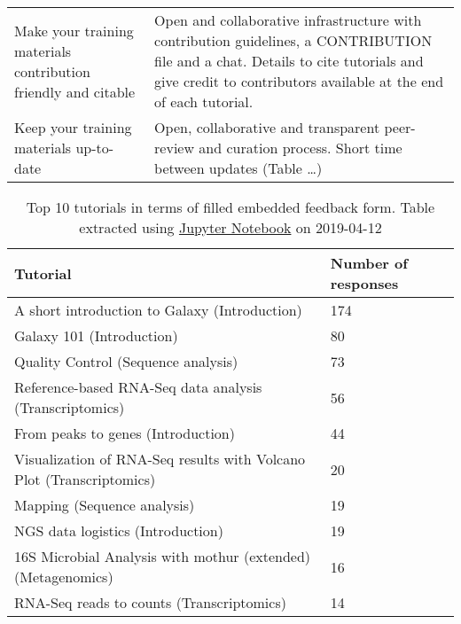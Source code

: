 \documentclass[10pt,letterpaper]{article}
\begin{document}
\begin{table}[]
\begin{tabular}{p{}p{}}
		Make your training materials contribution friendly and citable                                   & Open and collaborative infrastructure with contribution guidelines, a CONTRIBUTION file and a chat. Details to cite tutorials and give credit to contributors available at the end of each tutorial.\\
		Keep your training materials up-to-date                                                          & Open, collaborative and transparent peer-review and curation process. Short time between updates (Table …)\\
	\end{tabular}
\end{table}

\begin{table}[]
	\centering
	\caption{Top 10 tutorials in terms of filled embedded feedback form. Table extracted using \href{https://github.com/bebatut/galaxy-training-material-stats/blob/master/src/extract_repo_content_stats.ipynb}{Jupyter Notebook} on 2019-04-12\label{tbl:toptentutorials}}
	\begin{tabular}{p{}p{}}
		Tutorial                                                             & Number of responses \\\hline
		A short introduction to Galaxy (Introduction)                        & 174 \\
		Galaxy 101 (Introduction)                                            & 80 \\
		Quality Control (Sequence analysis)                                  & 73 \\
		Reference-based RNA-Seq data analysis (Transcriptomics)              & 56 \\
		From peaks to genes (Introduction)                                   & 44 \\
		Visualization of RNA-Seq results with Volcano Plot (Transcriptomics) & 20 \\
		Mapping (Sequence analysis)                                          & 19 \\
		NGS data logistics (Introduction)                                    & 19 \\
		16S Microbial Analysis with mothur (extended) (Metagenomics)         & 16 \\
		RNA-Seq reads to counts (Transcriptomics)                            & 14
	\end{tabular}
\end{table}
\end{document}
